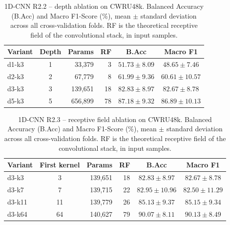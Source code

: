 \begin{table}[ht]
\centering
\caption{1D-CNN R2.2 -- depth ablation on CWRU48k. Balanced Accuracy (B.Acc) and Macro F1-Score (\%), mean $\pm$ standard deviation across all cross-validation folds. RF is the theoretical receptive field of the convolutional stack, in input samples.}
\label{tab:ablation_cnn1d_depth_cwru48k}
\begin{tabular}{@{}l c r r c c@{}}
\toprule
\textbf{Variant} & \textbf{Depth} & \textbf{Params} & \textbf{RF} & \textbf{B.Acc} & \textbf{Macro F1} \\ \midrule
d1-k3 & 1 & 33,379 & 3 & $51.73 \pm 8.09$ & $48.65 \pm 7.46$ \\
d2-k3 & 2 & 67,779 & 8 & $61.99 \pm 9.36$ & $60.61 \pm 10.57$ \\
d3-k3 & 3 & 139,651 & 18 & $82.83 \pm 8.97$ & $82.67 \pm 8.78$ \\
d5-k3 & 5 & 656,899 & 78 & $87.18 \pm 9.32$ & $86.89 \pm 10.13$ \\
\bottomrule
\end{tabular}
\end{table}

\begin{table}[ht]
\centering
\caption{1D-CNN R2.3 -- receptive field ablation on CWRU48k. Balanced Accuracy (B.Acc) and Macro F1-Score (\%), mean $\pm$ standard deviation across all cross-validation folds. RF is the theoretical receptive field of the convolutional stack, in input samples.}
\label{tab:ablation_cnn1d_kernel_cwru48k}
\begin{tabular}{@{}l c r r c c@{}}
\toprule
\textbf{Variant} & \textbf{First kernel} & \textbf{Params} & \textbf{RF} & \textbf{B.Acc} & \textbf{Macro F1} \\ \midrule
d3-k3 & 3 & 139,651 & 18 & $82.83 \pm 8.97$ & $82.67 \pm 8.78$ \\
d3-k7 & 7 & 139,715 & 22 & $82.95 \pm 10.96$ & $82.50 \pm 11.29$ \\
d3-k11 & 11 & 139,779 & 26 & $85.13 \pm 9.37$ & $85.15 \pm 9.34$ \\
d3-k64 & 64 & 140,627 & 79 & $90.07 \pm 8.11$ & $90.13 \pm 8.49$ \\
\bottomrule
\end{tabular}
\end{table}

